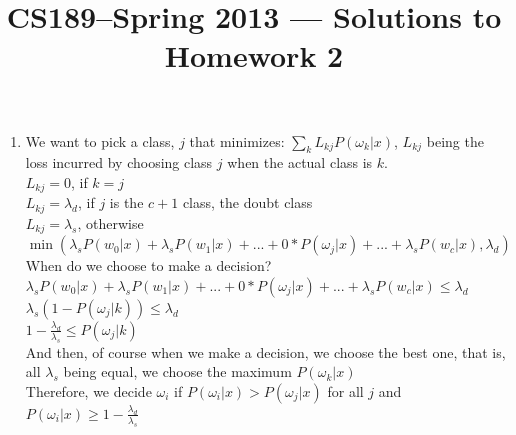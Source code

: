 \documentclass[11pt]{article}
\title{CS189--Spring 2013 --- Solutions to Homework 2}
\author{\Name}
\begin{document}
\maketitle

\begin{enumerate}
\item We want to pick a class, $j$ that minimizes:
$\sum\limits_{k}L_{kj}P(\omega_k|x)$, $L_{kj}$ being the loss incurred by choosing class $j$ when the actual class is $k$.\\
$L_{kj}=0$, if $k=j$\\
$L_{kj}=\lambda_d$, if $j$ is the $c+1$ class, the doubt class\\
$L_{kj}=\lambda_s$, otherwise\\

$\min(\lambda_sP(w_0|x)+\lambda_sP(w_1|x)+...+ 0*P(\omega_j|x) + ... + \lambda_sP(w_{c}|x), \lambda_d)$\\
When do we choose to make a decision?\\
$\lambda_sP(w_0|x)+\lambda_sP(w_1|x)+...+ 0*P(\omega_j|x) + ... + \lambda_sP(w_{c}|x) \le \lambda_d$\\
$\lambda_s(1-P(\omega_j|k)) \le \lambda_d$\\
$1-\frac{\lambda_d}{\lambda_s}\le P(\omega_j|k)$\\
And then, of course when we make a decision, we choose the best one, that is, all $\lambda_s$ being equal, we choose the maximum $P(\omega_k|x)$\\
Therefore, we decide $\omega_i$ if $P(\omega_i|x)>P(\omega_j|x)$ for all $j$ and $P(\omega_i|x)\ge 1-\frac{\lambda_d}{\lambda_s}$


\end{enumerate}
\end{document}
